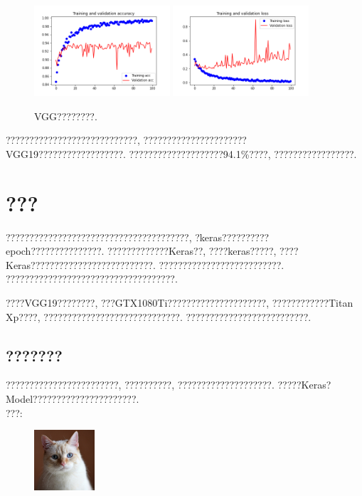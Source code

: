 \documentclass[lang=cn,11pt]{elegantpaper}
\begin{document}
\begin{figure}[hbt]
\centering
 \includegraphics[width=0.45\textwidth]{VGG_19_unlocked_1}
  \includegraphics[width=0.45\textwidth]{VGG_19_unlocked_2}
 \caption{VGG????????.\label{fig:vggunlock}}
\end{figure}

????????????????????????????, ??????????????????????VGG19??????????????????. ????????????????????94.1\%????, ?????????????????.

\section{???}

???????????????????????????????????????, ?keras??????????epoch???????????????. ?????????????Keras??, ????keras?????, ????Keras??????????????????????????. ??????????????????????????. ????????????????????????????????????.

????VGG19????????, ???GTX1080Ti?????????????????????, ????????????Titan Xp????, ?????????????????????????????. ??????????????????????????.

\subsection{???????}

????????????????????????, ??????????, ????????????????????. ?????Keras?Model??????????????????????.\\

???: 
\begin{figure}[htbp]
	\centering
	  \includegraphics[width=0.2\textwidth]{a.jpg}
\end{figure}
\end{document}

